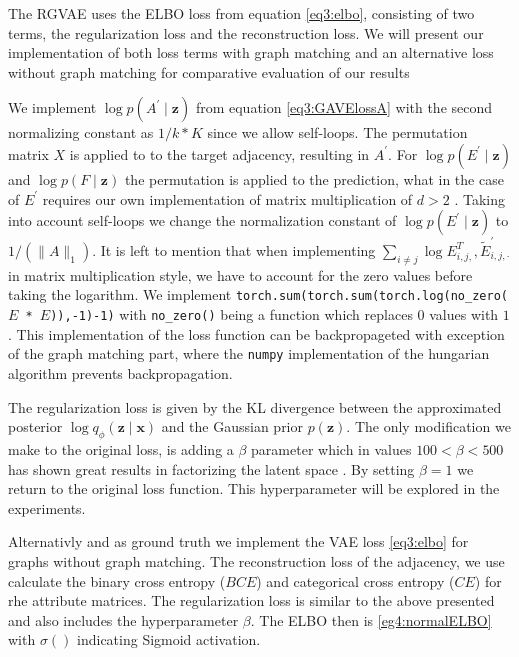 The RGVAE uses the ELBO loss from equation \ref{eq3:elbo}, consisting of two terms, the regularization loss and the reconstruction loss. We will present our implementation of both loss terms with graph matching and an alternative loss without graph matching for comparative evaluation of our results 

We implement $\log p\left(A^{\prime} \mid \mathbf{z}\right)$ from equation \ref{eq3:GAVElossA} with the second normalizing constant as $1 / k*K$ since we allow self-loops. The permutation matrix $X$ is applied to to the target adjacency, resulting in $A^{\prime}$. For $\log p\left(E^{\prime} \mid \mathbf{z}\right)$ and $\log p\left(F \mid \mathbf{z}\right)$ the permutation is applied to the prediction, what in the case of $E^\prime$ requires our own implementation of matrix multiplication of $d>2$ . Taking into account self-loops we change the normalization constant of $\log p\left(E^{\prime} \mid \mathbf{z}\right)$ to $1 /\left(\|A\|_{1}\right)$. It is left to mention that when implementing $\sum_{i \neq j} \log E_{i, j,}^{T}, \widetilde{E}_{i, j, \cdot}^{\prime}$ in matrix multiplication style, we have to account for the zero values before taking the logarithm. We implement \texttt{torch.sum(torch.sum(torch.log(no\_zero($E$ * $\hat{E}$)),-1)-1)} with \texttt{no\_zero()} being a function which replaces $0$ values with $1$. This implementation of the loss function can be backpropageted with exception of the graph matching part, where the \texttt{numpy} implementation of the hungarian algorithm prevents backpropagation.

The regularization loss is given by the KL divergence between the approximated posterior $\log q_{\phi}\left(\mathbf{z} \mid \mathbf{x}\right)$ and the Gaussian prior $p(\mathbf{z})$. The only modification we make to the original loss, is adding a $\beta$ parameter which in values $100<\beta <500$ has shown great results in factorizing the latent space \cite{higgins}. By setting $\beta=1$ we return to the original loss function. This hyperparameter will be explored in the experiments.


Alternativly and as ground truth we implement the VAE loss \ref{eq3:elbo} for graphs without graph matching. The reconstruction loss of the adjacency, we use calculate the binary cross entropy ($BCE$) and categorical cross entropy ($CE$) for rhe attribute matrices. The regularization loss is similar to the above presented and also includes the hyperparameter $\beta$. The ELBO then is \ref{eg4:normalELBO} with $\sigma()$ indicating Sigmoid activation.

